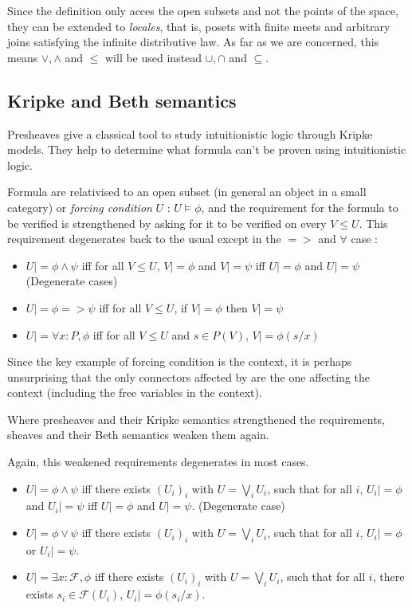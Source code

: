 \documentclass[11pt]{article}
\newcommand{\0}{\mathbf{0}}
\newcommand{\1}{\mathbf{1}}
\begin{document}
Since the definition only acces the open subsets and not the points of the space, they can be extended to \emph{locales}, that is, posets with finite meets and arbitrary joins satisfying the infinite distributive law. As far as we are concerned, this means $\vee,\wedge$ and $\leq$ will be used instead $\cup,\cap$ and $\subseteq$.

\subsection{Kripke and Beth semantics}

Presheaves give a classical tool to study intuitionistic logic through Kripke models. They help to determine what formula can't be proven using intuitionistic logic.

Formula are relativised to an open subset (in general an object in a small category) or \emph{forcing condition} $U$ : $U \models \phi$, and the requirement for the formula to be verified is strengthened by asking for it to be verified on every $V\leq U$. This requirement degenerates back to the usual except in the $=>$ and $\forall$ case : 
\begin{itemize}
    \item $U |= \phi \wedge \psi$ iff for all $V\leq U$, $V |= \phi$ and $V |= \psi$ iff $U |= \phi$ and $U |= \psi$ (Degenerate cases)
    \item $U |= \phi => \psi$ iff for all $V \leq U$, if $V |= \phi$ then $V |= \psi $
    \item $U |= \forall x : P, \phi$ iff for all $V \leq U$ and $s\in P(V)$, $V |= \phi(s/x) $
\end{itemize}

Since the key example of forcing condition is the context, it is perhaps unsurprising that the only connectors affected by are the one affecting the context (including the free variables in the context).

Where presheaves and their Kripke semantics strengthened the requirements, sheaves and their Beth semantics weaken them again.

Again, this weakened requirements degenerates in most cases.

\begin{itemize}
    \item $U |= \phi \wedge \psi$ iff there exists $(U_i)_i$ with $U = \bigvee_i U_i$, such that for all $i$, $U_i |= \phi$ and $U_i |= \psi $ iff $U |= \phi$ and $U |= \psi$. (Degenerate case)
    \item $U |= \phi \vee \psi $ iff there exists $(U_i)_i$ with $U = \bigvee_i U_i$, such that for all $i$, $U_i |= \phi$ or $U_i |= \psi $.
    \item $U |= \exists x : \mathcal{F}, \phi $ iff there exists $(U_i)_i$ with $U = \bigvee_i U_i$, such that for all $i$, there exists $s_i\in \mathcal{F}(U_i)$, $U_i |= \phi(s_i/x)$.
\end{itemize}
\end{document}
